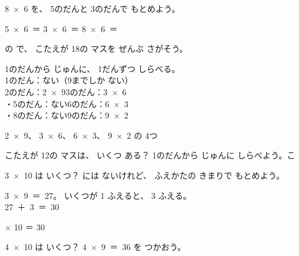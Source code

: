 \begin{jibun}
\mbox{8 × 6} を、 5のだんと 3のだんで もとめよう。\par\vspace{2pt}
\noindent\hspace*{1\zw}\mbox{5 × 6 ＝} \bkkakikomi\enspace\mbox{3 × 6 ＝} \bkkakikomi\enspace\mbox{8 × 6 ＝} \bkkakikomi
{}
\end{jibun}

\begin{reidai}
の で、 こたえが 18の マスを ぜんぶ さがそう。

\kangaekata 1のだんから じゅんに、 1だんずつ しらべる。\\
\bkqlkindent 1のだん：ない（9までしか ない）\\
\bkqlkindent 2のだん：\mbox{2 × 9}\quad 3のだん：\mbox{3 × 6}\\
・5のだん：ない\quad 6のだん：\mbox{6 × 3}\\
・8のだん：ない\quad 9のだん：\mbox{9 × 2}

\kotae \mbox{2 × 9}、 \mbox{3 × 6}、 \mbox{6 × 3}、 \mbox{9 × 2} の 4つ
\end{reidai}

\begin{jibun}
こたえが 12の マスは、 いくつ ある？ 1のだんから じゅんに しらべよう。\hfill\bkkakikomi\enspace こ
\end{jibun}

\begin{reidai}
\mbox{3 × 10} は いくつ？ には ないけれど、 ふえかたの きまりで もとめよう。

\kangaekata \mbox{3 × 9 ＝ 27}。 いくつが 1 ふえると、 3 ふえる。\\
\bkqlkindent\mbox{27 ＋ 3 ＝ 30}

 × 10 ＝ 30 
\end{reidai}

\begin{jibun}
\mbox{4 × 10} は いくつ？ \mbox{4 × 9 ＝ 36} を つかおう。
\bkshikiran[3\zw]
\end{jibun}


